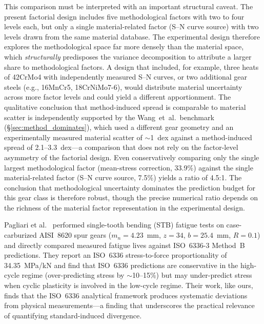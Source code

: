 \documentclass[12pt,a4paper]{article}
\begin{document}
This comparison must be interpreted with an important structural
caveat. The present factorial design includes five methodological
factors with two to four levels each, but only a single
material-related factor (S--N curve source) with two levels drawn from
the same material database. The experimental design therefore explores
the methodological space far more densely than the material space,
which \emph{structurally} predisposes the variance decomposition to
attribute a larger share to methodological factors. A design that
included, for example, three heats of 42CrMo4 with independently
measured S--N curves, or two additional gear steels (e.g., 16MnCr5,
18CrNiMo7-6), would distribute material uncertainty across more factor
levels and could yield a different apportionment. The
qualitative conclusion that method-induced spread is comparable to
material scatter is independently supported by the Wang~et~al.\
benchmark (\S\ref{sec:method_dominates}), which used a different gear
geometry and an experimentally measured material scatter of $\sim$1~dex
against a method-induced spread of 2.1--3.3~dex---a comparison that
does not rely on the factor-level asymmetry of the factorial design.
Even conservatively comparing only the single largest methodological
factor (mean-stress correction, 33.9\%) against the single
material-related factor (S--N curve source, 7.5\%) yields a ratio of
4.5:1. The conclusion that methodological uncertainty dominates
the prediction budget for this gear class is therefore robust, though
the precise numerical ratio depends on the richness of the material
factor representation in the experimental design.

Pagliari et al.~\cite{pagliari2025} performed single-tooth bending (STB)
fatigue tests on case-carburized AISI~8620 spur gears
($m_n{=}4.23$~mm, $z{=}34$, $b{=}25.4$~mm, $R{=}0.1$) and directly
compared measured fatigue lives against ISO~6336-3 Method~B predictions.
They report an ISO~6336 stress-to-force proportionality of
34.35~MPa/kN and find that ISO~6336 predictions are conservative in the
high-cycle regime (over-predicting stress by $\sim$10--15\%) but may
under-predict stress when cyclic plasticity is involved in the low-cycle
regime. Their work, like ours, finds that the ISO~6336 analytical
framework produces systematic deviations from physical measurements---a
finding that underscores the practical relevance of quantifying
standard-induced divergence.
\end{document}
